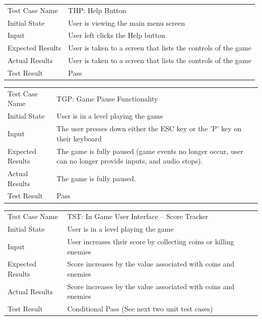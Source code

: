 \documentclass[12pt, titlepage]{article}
\begin{document}
\begin{center}
\begin{tabular}{ | l | p{10cm} | }
\hline
Test Case Name & THP: Help Button	\\
Initial State & User is viewing the main menu screen	\\
Input & User left clicks the Help button	\\
Expected Results & User is taken to a screen that lists the controls of the game	\\
Actual Results & User is taken to a screen that lists the controls of the game	\\
Test Result & Pass	\\
\hline
\end{tabular}
\end{center}

\begin{center}
\begin{tabular}{ | l | p{10cm} | }
\hline
Test Case Name & TGP: Game Pause Functionality	\\
Initial State & User is in a level playing the game	\\
Input & The user presses down either the ESC key or the 'P' key on their keyboard	\\
Expected Results & The game is fully paused (game events no longer occur, user can no longer provide inputs, and audio stops).	\\
Actual Results & The game is fully paused.	\\
Test Result & Pass	\\
\hline
\end{tabular}
\end{center}

\begin{center}
\begin{tabular}{ | l | p{10cm} | }
\hline
Test Case Name & TST: In Game User Interface – Score Tracker	\\
Initial State & User is in a level playing the game	\\
Input & User increases their score by collecting coins or killing enemies	\\
Expected Results & Score increases by the value associated with coins and enemies	\\
Actual Results & Score increases by the value associated with coins and enemies	\\
Test Result & Conditional Pass (See next two unit test cases)	\\
\hline
\end{tabular}
\end{center}
\end{document}
